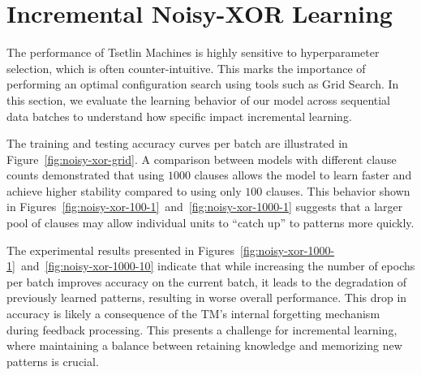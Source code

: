 \clearpage
\section{Incremental Noisy-XOR Learning}
The performance of Tsetlin Machines is highly sensitive to hyperparameter selection, which is often counter-intuitive. This marks the importance of performing an optimal configuration search using tools such as Grid Search. In this section, we evaluate the learning behavior of our model across sequential data batches to understand how specific impact incremental learning.

The training and testing accuracy curves per batch are illustrated in Figure~\ref{fig:noisy-xor-grid}. A comparison between models with different clause counts demonstrated that using $1000$ clauses allows the model to learn faster and achieve higher stability compared to using only $100$ clauses. This behavior shown in Figures~\ref{fig:noisy-xor-100-1}~and~\ref{fig:noisy-xor-1000-1} suggests that a larger pool of clauses may allow individual units to ``catch up'' to patterns more quickly.

The experimental results presented in Figures~\ref{fig:noisy-xor-1000-1}~and~\ref{fig:noisy-xor-1000-10} indicate that while increasing the number of epochs per batch improves accuracy on the current batch, it leads to the degradation of previously learned patterns, resulting in worse overall performance. This drop in accuracy is likely a consequence of the TM's internal forgetting mechanism during feedback processing. This presents a challenge for incremental learning, where maintaining a balance between retaining knowledge and memorizing new patterns is crucial.

